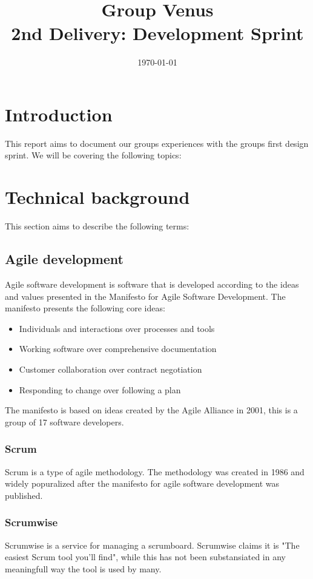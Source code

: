 \documentclass[12pt]{article}
\title{\textbf{Group Venus} \\ 2nd Delivery: Development Sprint}
\date{\today}
\begin{document}
\subsectionfont{\fontsize{12}{14}\selectfont}

\maketitle

\pagebreak

\tableofcontents



\section{Introduction}
This report aims to document our groups experiences with the groups first design sprint.
We will be covering the following topics:

\section{Technical background}
This section aims to describe the following terms:
\subsection{Agile development\cite{AgileSoftwareDevelopment2024}}
Agile software development is software that is developed according to the ideas and values presented in the 
Manifesto for Agile Software Development\cite{ManifestoAgileSoftware}.
The manifesto presents the following core ideas:
\begin{itemize}
    \item Individuals and interactions over processes and tools
    \item Working software over comprehensive documentation
    \item Customer collaboration over contract negotiation
    \item Responding to change over following a plan
\end{itemize}
The manifesto is based on ideas created by the Agile Alliance in 2001, 
this is a group of 17 software developers.
\subsubsection{Scrum\cite{Scrum2023}}
Scrum is a type of agile methodology. The methodology was created in 1986 and widely popuralized 
after the manifesto for agile software development was published.
\subsubsection{Scrumwise\cite{scrumwiseScrumToolsScrum}}
Scrumwise is a service for managing a scrumboard. Scrumwise claims it is "The easiest Scrum tool you'll find", 
while this has not been substansiated in any meaningfull way the tool is used by many.
\end{document}
